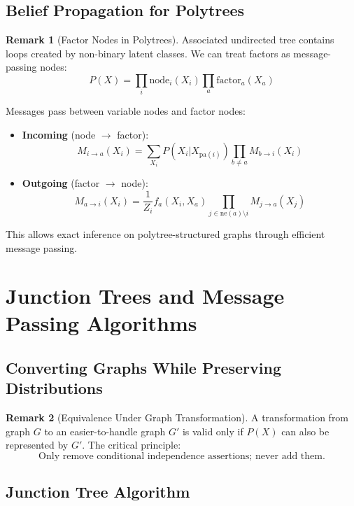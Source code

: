 \documentclass[12pt,a4paper]{article}
\theoremstyle{definition}
\newtheorem{remark}{Remark}[section]
\begin{document}
\subsection{Belief Propagation for Polytrees}

\begin{remark}[Factor Nodes in Polytrees]
Associated undirected tree contains loops created by non-binary latent classes. We can treat factors as message-passing nodes:
\[
P(X) = \prod_{i} \text{node}_i(X_i) \prod_{a} \text{factor}_a(X_a)
\]

Messages pass between variable nodes and factor nodes:

\begin{itemize}
    \item \textbf{Incoming} (node $\to$ factor): 
    \[
    M_{i \to a}(X_i) = \sum_{X_i} P(X_i | X_{\text{pa}(i)}) \prod_{b \neq a} M_{b \to i}(X_i)
    \]
    
    \item \textbf{Outgoing} (factor $\to$ node): 
    \[
    M_{a \to i}(X_i) = \frac{1}{Z_i} f_a(X_i, X_a) \prod_{j \in \text{ne}(a) \setminus i} M_{j \to a}(X_j)
    \]
\end{itemize}

This allows exact inference on polytree-structured graphs through efficient message passing.
\end{remark}

\newpage

\section{Junction Trees and Message Passing Algorithms}

\subsection{Converting Graphs While Preserving Distributions}

\begin{remark}[Equivalence Under Graph Transformation]
A transformation from graph $G$ to an easier-to-handle graph $G'$ is valid only if $P(X)$ can also be represented by $G'$. The critical principle:
\[
\text{Only remove conditional independence assertions; never add them.}
\]
\end{remark}

\subsection{Junction Tree Algorithm}
\end{document}
